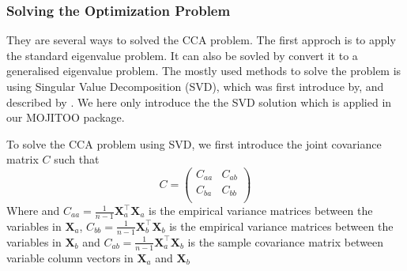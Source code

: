 \subsubsection{Solving the Optimization Problem}
They are several ways to solved the CCA problem. The first approch is to apply the standard eigenvalue problem\citep{HOTELLING1936cca2,hooper1959ccaeigen}. It can also be sovled by convert it to a generalised eigenvalue problem\citep{bach2002kernel,hardoon2004canonical}. The mostly used methods to solve the problem is using Singular Value Decomposition (SVD), which was first introduce by\citep{healy1957ccasvd}, and described by \citep{ewerbring1989canonical}. We here only introduce the the SVD solution which is applied in our MOJITOO package.


To solve the CCA problem using SVD, we first introduce the joint covariance matrix $C$ such that
\begin{equation}
	C = \begin{pmatrix}
		C_{aa} & C_{ab}\\
		C_{ba} & C_{bb}\\
	\end{pmatrix}	
\end{equation}
Where  and $C_{aa} = \frac{1}{n-1} \mathbf{X}_a^\top \mathbf{X}_a$ is the empirical variance matrices between the variables in $\mathbf{X}_a$, $C_{bb} = \frac{1}{n-1} \mathbf{X}_b^\top \mathbf{X}_b$ is the empirical variance matrices between the variables in $\mathbf{X}_b$ and $C_{ab} = \frac{1}{n-1} \mathbf{X}_a^\top \mathbf{X}_b$ is the sample covariance matrix between variable column vectors in $\mathbf{X}_a$ and $\mathbf{X}_b$


